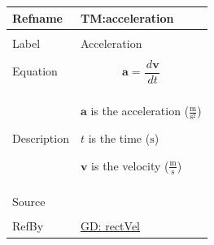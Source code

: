 \documentclass[12pt]{article}
\begin{document}
\vspace{\baselineskip}
\noindent
\begin{minipage}{\textwidth}
\begin{tabular}{>{\raggedright}p{}>{\raggedright\arraybackslash}p{}}
\toprule \textbf{Refname} & \textbf{TM:acceleration}
\label{TM:acceleration}
\\ \midrule \\
Label & Acceleration
        
\\ \midrule \\
Equation & \begin{displaymath}
           \mathbf{a}=\frac{\,d\mathbf{v}}{\,dt}
           \end{displaymath}
\\ \midrule \\
Description & \begin{symbDescription}
              \item{$\mathbf{a}$ is the acceleration ($\frac{\text{m}}{\text{s}^{2}}$)}
              \item{$t$ is the time (${\text{s}}$)}
              \item{$\mathbf{v}$ is the velocity ($\frac{\text{m}}{\text{s}}$)}
              \end{symbDescription}
\\ \midrule \\
Source & \cite{accelerationWiki}
         
\\ \midrule \\
RefBy & \hyperref[GD:rectVel]{GD: rectVel}
        
\\ \bottomrule
\end{tabular}
\end{minipage}
\vspace{\baselineskip}
\noindent
\end{document}
